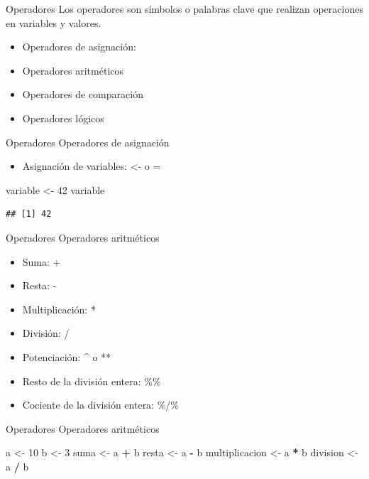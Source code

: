 \documentclass[
  ignorenonframetext,
]{beamer}
\newenvironment{Shaded}{\begin{snugshade}}{\end{snugshade}}
\newcommand{\DecValTok}[1]{\textcolor[rgb]{0.00,0.00,0.81}{#1}}
\newcommand{\NormalTok}[1]{#1}
\newcommand{\OtherTok}[1]{\textcolor[rgb]{0.56,0.35,0.01}{#1}}
\newcommand{\SpecialCharTok}[1]{\textcolor[rgb]{0.81,0.36,0.00}{\textbf{#1}}}
\providecommand{\tightlist}{%
  \setlength{\itemsep}{0pt}\setlength{\parskip}{0pt}}
\begin{document}
\begin{frame}[fragile]{Operadores}
\protect\hypertarget{operadores}{}
Los operadores son símbolos o palabras clave que realizan operaciones en
variables y valores.

\begin{itemize}
\tightlist
\item
  Operadores de asignación:
\item
  Operadores aritméticos
\item
  Operadores de comparación
\item
  Operadores lógicos
\end{itemize}

\begin{block}{Operadores \textbar{} Operadores de asignación}
\protect\hypertarget{operadores-operadores-de-asignaciuxf3n}{}
\begin{itemize}
\tightlist
\item
  Asignación de variables: \textless- o =
\end{itemize}

\begin{Shaded}
\begin{Highlighting}[]
\NormalTok{variable }\OtherTok{\textless{}{-}} \DecValTok{42}
\NormalTok{variable}
\end{Highlighting}
\end{Shaded}

\begin{verbatim}
## [1] 42
\end{verbatim}
\end{block}

\begin{block}{Operadores \textbar{} Operadores aritméticos}
\protect\hypertarget{operadores-operadores-aritmuxe9ticos}{}
\begin{itemize}
\tightlist
\item
  Suma: +
\item
  Resta: -
\item
  Multiplicación: *
\item
  División: /
\item
  Potenciación: \^{} o **
\item
  Resto de la división entera: \%\%
\item
  Cociente de la división entera: \%/\%
\end{itemize}
\end{block}

\begin{block}{Operadores \textbar{} Operadores aritméticos}
\protect\hypertarget{operadores-operadores-aritmuxe9ticos-1}{}
\begin{Shaded}
\begin{Highlighting}[]
\NormalTok{a }\OtherTok{\textless{}{-}} \DecValTok{10}
\NormalTok{b }\OtherTok{\textless{}{-}} \DecValTok{3}
\NormalTok{suma }\OtherTok{\textless{}{-}}\NormalTok{ a }\SpecialCharTok{+}\NormalTok{ b}
\NormalTok{resta }\OtherTok{\textless{}{-}}\NormalTok{ a }\SpecialCharTok{{-}}\NormalTok{ b}
\NormalTok{multiplicacion }\OtherTok{\textless{}{-}}\NormalTok{ a }\SpecialCharTok{*}\NormalTok{ b}
\NormalTok{division }\OtherTok{\textless{}{-}}\NormalTok{ a }\SpecialCharTok{/}\NormalTok{ b}


\end{Highlighting}
\end{Shaded}
\end{block}
\end{frame}
\end{document}

